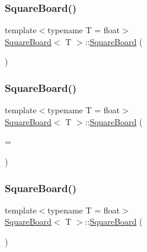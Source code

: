 \mbox{\label{classSquareBoard_a9a6c27e98ae10d6cb601140ef6a3ff59}} 
\subsubsection{\texorpdfstring{Square\+Board()}{SquareBoard()}\hspace{0.1cm}{\footnotesize\ttfamily [3/6]}}
{\footnotesize\ttfamily template$<$typename T  = float$>$ \\
\mbox{\hyperlink{classSquareBoard}{Square\+Board}}$<$ T $>$\+::\mbox{\hyperlink{classSquareBoard}{Square\+Board}} (\begin{DoxyParamCaption}\item[{const \mbox{\hyperlink{classSquareBoard}{Square\+Board}}$<$ T $>$ \&}]{ }\end{DoxyParamCaption})\hspace{0.3cm}{\ttfamily [default]}}

\mbox{\label{classSquareBoard_aa7aac1a02a00ce9ad0c9441fffa71e02}} 
\subsubsection{\texorpdfstring{Square\+Board()}{SquareBoard()}\hspace{0.1cm}{\footnotesize\ttfamily [4/6]}}
{\footnotesize\ttfamily template$<$typename T  = float$>$ \\
\mbox{\hyperlink{classSquareBoard}{Square\+Board}}$<$ T $>$\+::\mbox{\hyperlink{classSquareBoard}{Square\+Board}} (\begin{DoxyParamCaption}\item[{unsigned}]{ = {} }\end{DoxyParamCaption})}

\mbox{\label{classSquareBoard_a23c495a2419aded87c0b2803de409b5e}} 
\subsubsection{\texorpdfstring{Square\+Board()}{SquareBoard()}\hspace{0.1cm}{\footnotesize\ttfamily [5/6]}}
{\footnotesize\ttfamily template$<$typename T  = float$>$ \\
\mbox{\hyperlink{classSquareBoard}{Square\+Board}}$<$ T $>$\+::\mbox{\hyperlink{classSquareBoard}{Square\+Board}} (\begin{DoxyParamCaption}\item[{\mbox{\hyperlink{classSquareBoard}{Square\+Board}}$<$ T $>$ \&\&}]{ }\end{DoxyParamCaption})\hspace{0.3cm}{\ttfamily [default]}}

